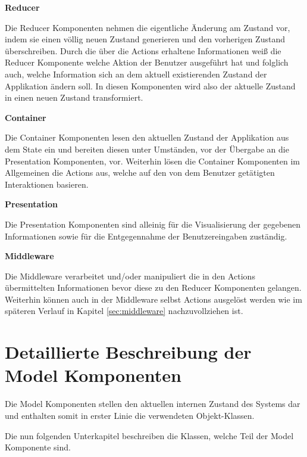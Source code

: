 \documentclass[bibliography=totoc,listof=totoc,BCOR=5mm,DIV=12,oneside]{scrbook}
\begin{document}
\par \bigskip \textbf{Reducer}
\par Die Reducer Komponenten nehmen die eigentliche Änderung am Zustand vor, indem sie einen völlig neuen Zustand generieren und den vorherigen Zustand überschreiben. Durch die über die Actions erhaltene Informationen weiß die Reducer Komponente welche Aktion der Benutzer ausgeführt hat und folglich auch, welche Information sich an dem aktuell existierenden Zustand der Applikation ändern soll. In diesen Komponenten wird also der aktuelle Zustand in einen neuen Zustand transformiert.

\par \bigskip \textbf{Container}
\par Die Container Komponenten lesen den aktuellen Zustand der Applikation aus dem State ein und bereiten diesen unter Umständen, vor der Übergabe an die Presentation Komponenten, vor. Weiterhin lösen die Container Komponenten im Allgemeinen die Actions aus, welche auf den von dem Benutzer getätigten Interaktionen basieren.

\par \bigskip \textbf{Presentation}
\par Die Presentation Komponenten sind alleinig für die Visualisierung der gegebenen Informationen sowie für die Entgegennahme der Benutzereingaben zuständig.

\par \bigskip \textbf{Middleware}
\par Die Middleware verarbeitet und/oder manipuliert die in den Actions übermittelten Informationen bevor diese zu den Reducer Komponenten gelangen. Weiterhin können auch in der Middleware selbst Actions ausgelöst werden wie im späteren Verlauf in Kapitel \ref{sec:middleware} nachzuvollziehen ist. 

\newpage
\section{Detaillierte Beschreibung der Model Komponenten}
\label{sec:komponentenDetails}
\par Die Model Komponenten stellen den aktuellen internen Zustand des Systems dar und enthalten somit in erster Linie die verwendeten Objekt-Klassen.
\par \medskip Die nun folgenden Unterkapitel beschreiben die Klassen, welche Teil der  Model Komponente sind.
\end{document}
